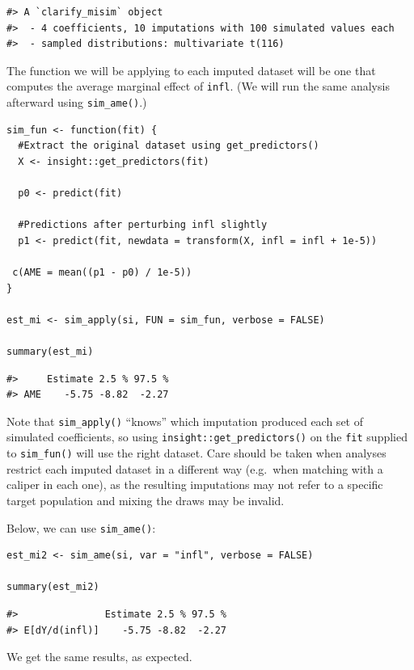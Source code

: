 \begin{verbatim}
#> A `clarify_misim` object
#>  - 4 coefficients, 10 imputations with 100 simulated values each
#>  - sampled distributions: multivariate t(116)
\end{verbatim}

The function we will be applying to each imputed dataset will be one that computes the average marginal effect of \texttt{infl}. (We will run the same analysis afterward using \texttt{sim\_ame()}.)

\begin{verbatim}
sim_fun <- function(fit) {
  #Extract the original dataset using get_predictors()
  X <- insight::get_predictors(fit)
  
  p0 <- predict(fit)
  
  #Predictions after perturbing infl slightly
  p1 <- predict(fit, newdata = transform(X, infl = infl + 1e-5))
  
 c(AME = mean((p1 - p0) / 1e-5))
}

est_mi <- sim_apply(si, FUN = sim_fun, verbose = FALSE)

summary(est_mi)
\end{verbatim}

\begin{verbatim}
#>     Estimate 2.5 % 97.5 %
#> AME    -5.75 -8.82  -2.27
\end{verbatim}

Note that \texttt{sim\_apply()} ``knows'' which imputation produced each set of simulated coefficients, so using \texttt{insight::get\_predictors()} on the \texttt{fit} supplied to \texttt{sim\_fun()} will use the right dataset. Care should be taken when analyses restrict each imputed dataset in a different way (e.g.~when matching with a caliper in each one), as the resulting imputations may not refer to a specific target population and mixing the draws may be invalid.

Below, we can use \texttt{sim\_ame()}:

\begin{verbatim}
est_mi2 <- sim_ame(si, var = "infl", verbose = FALSE)

summary(est_mi2)
\end{verbatim}

\begin{verbatim}
#>               Estimate 2.5 % 97.5 %
#> E[dY/d(infl)]    -5.75 -8.82  -2.27
\end{verbatim}

We get the same results, as expected.

